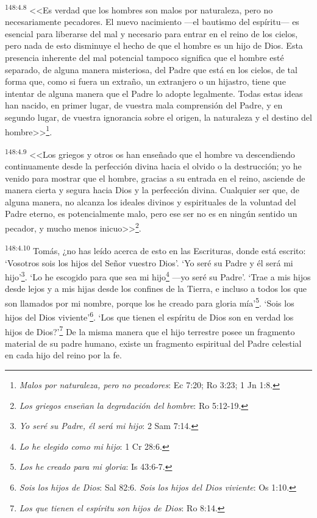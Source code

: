\par 
\textsuperscript{148:4.8} <<Es verdad que los hombres son malos por naturaleza, pero no necesariamente pecadores. El nuevo nacimiento ---el bautismo del espíritu--- es esencial para liberarse del mal y necesario para entrar en el reino de los cielos, pero nada de esto disminuye el hecho de que el hombre es un hijo de Dios. Esta presencia inherente del mal potencial tampoco significa que el hombre esté separado, de alguna manera misteriosa, del Padre que está en los cielos, de tal forma que, como si fuera un extraño, un extranjero o un hijastro, tiene que intentar de alguna manera que el Padre lo adopte legalmente. Todas estas ideas han nacido, en primer lugar, de vuestra mala comprensión del Padre, y en segundo lugar, de vuestra ignorancia sobre el origen, la naturaleza y el destino del hombre>>\footnote{\textit{Malos por naturaleza, pero no pecadores}: Ec 7:20; Ro 3:23; 1 Jn 1:8.}.

\par 
\textsuperscript{148:4.9} <<Los griegos y otros os han enseñado que el hombre va descendiendo continuamente desde la perfección divina hacia el olvido o la destrucción; yo he venido para mostrar que el hombre, gracias a su entrada en el reino, asciende de manera cierta y segura hacia Dios y la perfección divina. Cualquier ser que, de alguna manera, no alcanza los ideales divinos y espirituales de la voluntad del Padre eterno, es potencialmente malo, pero ese ser no es en ningún sentido un pecador, y mucho menos inicuo>>\footnote{\textit{Los griegos enseñan la degradación del hombre}: Ro 5:12-19.}.

\par 
\textsuperscript{148:4.10} \guillemotleft Tomás, ¿no has leído acerca de esto en las Escrituras, donde está escrito: `Vosotros sois los hijos del Señor vuestro Dios'. `Yo seré su Padre y él será mi hijo'\footnote{\textit{Yo seré su Padre, él será mi hijo}: 2 Sam 7:14.}. `Lo he escogido para que sea mi hijo\footnote{\textit{Lo he elegido como mi hijo}: 1 Cr 28:6.} ---yo seré su Padre'. `Trae a mis hijos desde lejos y a mis hijas desde los confines de la Tierra, e incluso a todos los que son llamados por mi nombre, porque los he creado para gloria mía'\footnote{\textit{Los he creado para mi gloria}: Is 43:6-7.}. `Sois los hijos del Dios viviente'\footnote{\textit{Sois los hijos de Dios}: Sal 82:6. \textit{Sois los hijos del Dios viviente}: Os 1:10.}. `Los que tienen el espíritu de Dios son en verdad los hijos de Dios?'\footnote{\textit{Los que tienen el espíritu son hijos de Dios}: Ro 8:14.} De la misma manera que el hijo terrestre posee un fragmento material de su padre humano, existe un fragmento espiritual del Padre celestial en cada hijo del reino por la fe\guillemotright.

